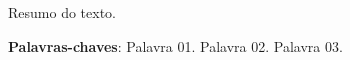 

\begin{resumo}
	\SingleSpacing
	
	Resumo do texto.
	
	\noindent 
	\textbf{Palavras-chaves}: Palavra 01. Palavra 02. Palavra 03.
\end{resumo}



